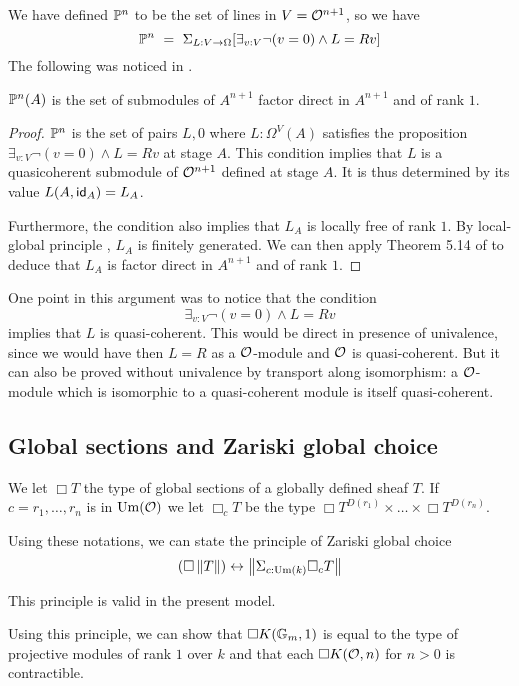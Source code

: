 We have defined $\mathbb{P}^n$ to be the set of lines in $V = \mathcal O^{n+1}$, so we have
$$
\mathbb{P}^n ~=~ \Sigma_{L:V\rightarrow \Omega}[\exists_{v:V}\neg (v = 0)\wedge L = R v]
$$
The following was noticed in \cite{kockreyes}.

\begin{proposition}
  $\mathbb{P}^n(A)$ is the set of submodules of $A^{n+1}$ factor direct in $A^{n+1}$ and of rank $1$.
\end{proposition}

\begin{proof}
  $\mathbb{P}^n$ is the set of pairs $L,0$ where $L:\Omega^V(A)$ satisfies the proposition $\exists_{v:V}\neg (v = 0)\wedge L = Rv$ at stage
  $A$. This condition implies that $L$ is a quasicoherent submodule of $\mathcal O^{n+1}$ defined at stage $A$.
  It is thus determined by its value $L(A,\mathsf{id}_A) = L_A$.

  Furthermore, the condition also implies that $L_A$ is locally free of rank $1$. By local-global principle \cite{lombardi-quitte},
  $L_A$ is finitely generated. We can then apply Theorem 5.14 of
  \cite{lombardi-quitte} to deduce that $L_A$ is factor direct in $A^{n+1}$ and of rank $1$.
\end{proof}

One point in this argument was to notice that the condition
$$
\exists_{v:V}\neg (v = 0)\wedge L = R v
$$
implies that $L$ is quasi-coherent. This would be direct in presence of univalence, since we would have then $L = R$ as a $\mathcal O$-module
and $\mathcal O$ is quasi-coherent. But it can also be proved without univalence by transport along isomorphism: a $\mathcal O$-module which is
isomorphic to a quasi-coherent module is itself quasi-coherent.


\subsection{Global sections and Zariski global choice}

We let $\Box T$ the type of global sections of a globally defined sheaf $T$.
If $c = r_1,\dots,r_n$ is in $\mathrm{Um}(\mathcal O)$ we let $\Box_c T$ be the type $\Box T^{D(r_1)}\times\dots\times\Box T^{D(r_n)}$.

Using these notations, we can state the principle of Zariski global choice
$$
(\Box \left\lVert T \right\rVert)\leftrightarrow \left\lVert \Sigma_{c:\mathrm{Um}(k)}\Box_c T \right\rVert
$$

This principle is valid in the present model.

Using this principle, we can show that $\Box K(\mathbb{G}_m,1)$ is equal to the type of projective modules of rank $1$ over $k$
and that each $\Box K(\mathcal O,n)$ for $n>0$ is contractible.
                                                                                  

 
